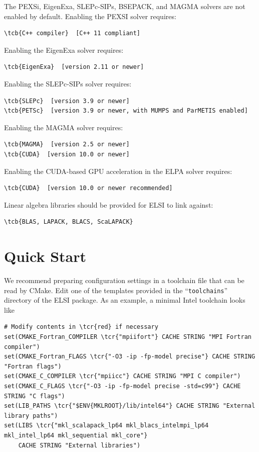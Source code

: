 \documentclass{report}
\newcommand{\tcb}[1]{\textcolor{blue}{#1}}
\newcommand{\tcr}[1]{\textcolor{red}{#1}}
\begin{document}
The PEXSi, EigenExa, SLEPc-SIPs, BSEPACK, and MAGMA solvers are not enabled by default. Enabling the PEXSI solver requires:
\begin{Verbatim}[commandchars=\\\{\}]
\tcb{C++ compiler}  [C++ 11 compliant]
\end{Verbatim}

Enabling the EigenExa solver requires:
\begin{Verbatim}[commandchars=\\\{\}]
\tcb{EigenExa}  [version 2.11 or newer]
\end{Verbatim}

Enabling the SLEPc-SIPs solver requires:
\begin{Verbatim}[commandchars=\\\{\}]
\tcb{SLEPc}  [version 3.9 or newer]
\tcb{PETSc}  [version 3.9 or newer, with MUMPS and ParMETIS enabled]
\end{Verbatim}

Enabling the MAGMA solver requires:
\begin{Verbatim}[commandchars=\\\{\}]
\tcb{MAGMA}  [version 2.5 or newer]
\tcb{CUDA}  [version 10.0 or newer]
\end{Verbatim}

Enabling the CUDA-based GPU acceleration in the ELPA solver requires:
\begin{Verbatim}[commandchars=\\\{\}]
\tcb{CUDA}  [version 10.0 or newer recommended]
\end{Verbatim}

Linear algebra libraries should be provided for ELSI to link against:
\begin{Verbatim}[commandchars=\\\{\}]
\tcb{BLAS, LAPACK, BLACS, ScaLAPACK}
\end{Verbatim}

\section{Quick Start}
\label{sec:quick}
We recommend preparing configuration settings in a toolchain file that can be read by CMake. Edit one of the templates provided in the ``\texttt{toolchains}'' directory of the ELSI package. As an example, a minimal Intel toolchain looks like
\begin{tcolorbox}
\begin{Verbatim}[commandchars=\\\{\}]
# Modify contents in \tcr{red} if necessary
set(CMAKE_Fortran_COMPILER \tcr{"mpiifort"} CACHE STRING "MPI Fortran compiler")
set(CMAKE_Fortran_FLAGS \tcr{"-O3 -ip -fp-model precise"} CACHE STRING "Fortran flags")
set(CMAKE_C_COMPILER \tcr{"mpiicc"} CACHE STRING "MPI C compiler")
set(CMAKE_C_FLAGS \tcr{"-O3 -ip -fp-model precise -std=c99"} CACHE STRING "C flags")
set(LIB_PATHS \tcr{"$ENV{MKLROOT}/lib/intel64"} CACHE STRING "External library paths")
set(LIBS \tcr{"mkl_scalapack_lp64 mkl_blacs_intelmpi_lp64 mkl_intel_lp64 mkl_sequential mkl_core"}
    CACHE STRING "External libraries")
\end{Verbatim}
\end{tcolorbox}
\end{document}

